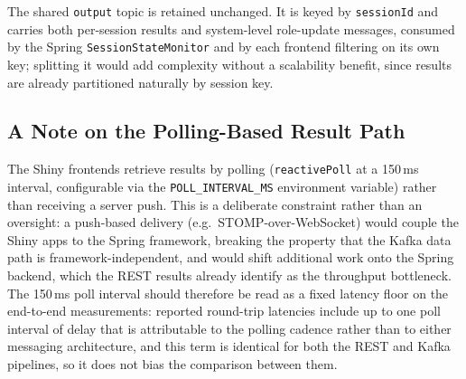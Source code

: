\documentclass[11pt,a4paper]{article}
\begin{document}
The shared \texttt{output} topic is retained unchanged. It is keyed by
\texttt{sessionId} and carries both per-session results and
system-level role-update messages, consumed by the Spring
\texttt{SessionStateMonitor} and by each frontend filtering on its own
key; splitting it would add complexity without a scalability benefit,
since results are already partitioned naturally by session key.

\subsection{A Note on the Polling-Based Result Path}

The Shiny frontends retrieve results by polling
(\texttt{reactivePoll} at a 150\,ms interval, configurable via the
\texttt{POLL\_INTERVAL\_MS} environment variable) rather than receiving
a server push. This is a deliberate constraint rather than an
oversight: a push-based delivery (e.g.\ STOMP-over-WebSocket) would
couple the Shiny apps to the Spring framework, breaking the property
that the Kafka data path is framework-independent, and would shift
additional work onto the Spring backend, which the REST results already
identify as the throughput bottleneck. The 150\,ms poll interval should
therefore be read as a fixed latency floor on the end-to-end
measurements: reported round-trip latencies include up to one poll
interval of delay that is attributable to the polling cadence rather
than to either messaging architecture, and this term is identical for
both the REST and Kafka pipelines, so it does not bias the comparison
between them.
\end{document}
